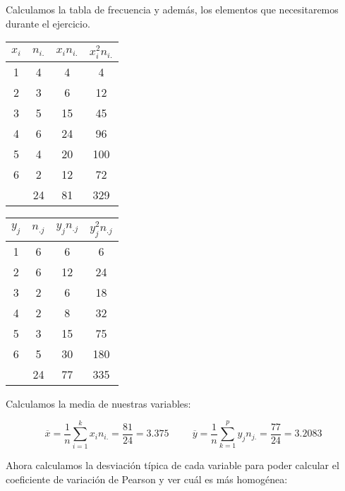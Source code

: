 \subproblem
Calculamos la tabla de frecuencia y además, los elementos que necesitaremos durante el ejercicio.

\begin{table}[h]
    \centering
    \begin{tabular}{|c|c|c|c|}
        \hline
         $x_i$ & $n_{i.}$ & $x_{i}n_{i.}$ & $x_i^2 n_{i.}$ \\ \hline
         1 & 4 & 4 & 4 \\ \hline 
         2 & 3 & 6 & 12 \\ \hline 
         3 & 5 & 15 & 45\\ \hline 
         4 & 6 & 24 & 96 \\ \hline 
         5 & 4 & 20 & 100 \\ \hline 
         6 & 2 & 12 & 72 \\ \hline 
           & 24 & 81 & 329 \\ \hline 
    \end{tabular}
\end{table}

\begin{table}[h]
    \centering
    \begin{tabular}{|c|c|c|c|}
        \hline
         $y_j$ & $n_{.j}$ & $y_{j}n_{.j}$ & $y_{j}^2n_{.j}$ \\ \hline
         1 & 6 & 6 & 6 \\ \hline 
         2 & 6 & 12 & 24 \\ \hline 
         3 & 2 & 6 & 18 \\ \hline 
         4 & 2 & 8 & 32 \\ \hline 
         5 & 3 & 15 & 75 \\ \hline 
         6 & 5 & 30 & 180 \\ \hline
           & 24 & 77 & 335 \\ \hline 
    \end{tabular}
\end{table}

\subproblem
Calculamos la media de nuestras variables:

\begin{equation*}
    \overline{x} = \dfrac{1}{n} \sum_{i=1}^k x_i n_{i.} = \dfrac{81}{24} = 3.375
    \hspace{1cm}
    \overline{y} = \dfrac{1}{n} \sum_{k=1}^p y_j n_{j.} = \dfrac{77}{24} = 3.2083
\end{equation*}

Ahora calculamos la desviación típica de cada variable para poder calcular el coeficiente de variación de Pearson y ver cuál es más homogénea:

